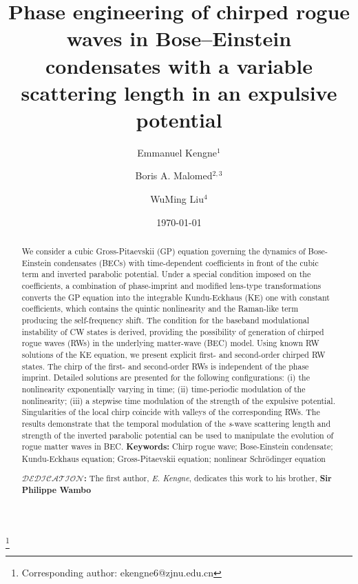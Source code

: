 \documentclass[preprintnumbers]{revtex4}
\begin{document}
\preprint{}
\title{Phase engineering of chirped rogue waves in Bose--Einstein
condensates with a variable scattering length in an expulsive potential}
\author{Emmanuel Kengne$^{1}$ }
\thanks{Corresponding author: ekengne6@zjnu.edu.cn}
\author{Boris A. Malomed$^{2,3}$}
\author{ WuMing Liu$^{4}$}
\date{\today }

\begin{abstract}
We consider a cubic Gross-Pitaevskii (GP) equation governing the dynamics of
Bose-Einstein condensates (BECs) with time-dependent coefficients in front
of the cubic term and inverted parabolic potential. Under a special
condition imposed on the coefficients, a combination of phase-imprint and
modified lens-type transformations converts the GP equation into the
integrable Kundu-Eckhaus (KE) one with constant coefficients, which contains
the quintic nonlinearity and the Raman-like term producing the
self-frequency shift. The condition for the baseband modulational
instability of CW states is derived, providing the possibility of generation
of chirped rogue waves (RWs) in the underlying matter-wave (BEC) model.
Using known RW solutions of the KE equation, we present explicit first- and
second-order chirped RW states. The chirp of the first- and second-order RWs
is independent of the phase imprint. Detailed solutions are presented for
the following configurations: (i) the nonlinearity exponentially varying in
time; (ii) time-periodic modulation of the nonlinearity; (iii) a stepwise
time modulation of the strength of the expulsive potential. Singularities of
the local chirp coincide with valleys of the corresponding RWs. The results
demonstrate that the temporal modulation of the \textit{s}-wave scattering
length and strength of the inverted parabolic potential can be used to
manipulate the evolution of rogue matter waves in BEC.\bigskip \newline
\textbf{Keywords:} Chirp rogue wave; Bose-Einstein condensate; Kundu-Eckhaus
equation; Gross-Pitaevskii equation; nonlinear Schr\"{o}dinger
equation\bigskip

$\mathcal{DEDICATION}$\textbf{:} The first author, \textit{E. Kengne},
dedicates this work to his brother, \textbf{Sir Philippe Wambo}
\end{abstract}
\end{document}
